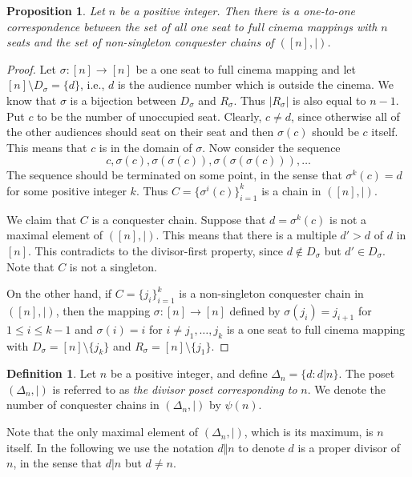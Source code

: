 \documentclass{amsart}
\newtheorem{proposition}[theorem]{Proposition}
\theoremstyle{definition}
\newtheorem{definition}[theorem]{Definition}
\begin{document}
\begin{proposition}
Let $n$ be a positive integer. Then there is a one-to-one correspondence between the set of all one seat to full cinema mappings with $n$ seats and the set of non-singleton conquester chains of $([n],|)$. 
\end{proposition}

\begin{proof}
Let $\sigma:[n]\to[n]$ be a one seat to full cinema mapping and let $[n]\setminus D_\sigma=\{d\}$, i.e., $d$ is the audience number which is outside the cinema. We know that $\sigma$ is a bijection between $D_\sigma$ and $R_\sigma$. Thus $|R_\sigma|$ is also equal to $n-1$. Put $c$ to be the number of unoccupied seat. Clearly, $c\neq d$, since otherwise all of the other audiences should seat on their seat and then $\sigma(c)$ should be $c$ itself. This means that $c$ is in the domain of $\sigma$. Now consider the sequence
\[c, \sigma(c),\sigma(\sigma(c)),\sigma(\sigma(\sigma(c))),\ldots\]
The sequence should be terminated on some point, in the sense that $\sigma^{k}(c)=d$ for some positive integer $k$. Thus $C=\{\sigma^i(c)\}_{i=1}^k$ is a chain in $([n],|)$.

We claim that $C$ is a conquester chain. Suppose that $d=\sigma^{k}(c)$ is not a maximal element of $([n],|)$. This means that there is a multiple $d'> d$ of $d$ in $[n]$. This contradicts to the divisor-first property, since $d\notin D_\sigma$ but $d'\in D_\sigma$. Note that $C$ is not a singleton.

On the other hand, if $C=\{j_i\}_{i=1}^k$ is a non-singleton conquester chain in $([n],|)$, then the mapping $\sigma:[n]\to[n]$ defined by $\sigma(j_i)=j_{i+1}$ for $1\leqslant i\leqslant k-1$ and $\sigma(i)=i$  for $i\neq j_1,\ldots,j_k$ is a one seat to full cinema mapping with $D_\sigma=[n]\setminus\{j_k\}$ and $R_\sigma=[n]\setminus\{j_1\}$. 
\end{proof}

\begin{definition}
Let $n$ be a positive integer, and define $\Delta_n = \{d: d|n\}$. The poset $(\Delta_n,|)$ is referred to as \textit{the divisor poset corresponding to} $n$. We denote the number of conquester chains in $(\Delta_n,|)$ by $\psi(n)$.
\end{definition}

Note that the only maximal element of $(\Delta_n,|)$, which is its maximum, is $n$ itself. In the following we use the notation $d\Vert n$ to denote $d$ is a proper divisor of $n$, in the sense that $d|n$ but $d\neq n$.
\end{document}
